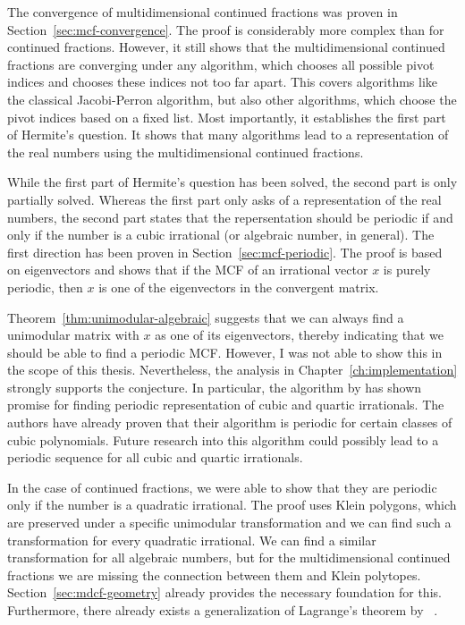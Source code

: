 The convergence of multidimensional continued fractions was proven in Section~\ref{sec:mcf-convergence}.
The proof is considerably more complex than for continued fractions.
However, it still shows that the multidimensional continued fractions are
converging under any algorithm, which chooses all possible pivot indices and
chooses these indices not too far apart.
This covers algorithms like the classical Jacobi-Perron algorithm,
but also other algorithms, which choose the pivot indices based on a fixed list.
Most importantly, it establishes the first part of Hermite's question.
It shows that many algorithms lead to a representation of the real numbers
using the multidimensional continued fractions.

While the first part of Hermite's question has been solved,
the second part is only partially solved.
Whereas the first part only asks of a representation of the real numbers,
the second part states that the repersentation should be periodic if and only
if the number is a cubic irrational (or algebraic number, in general).
The first direction has been proven in Section~\ref{sec:mcf-periodic}.
The proof is based on eigenvectors and shows that if the MCF of an irrational vector $x$ is
purely periodic, then $x$ is one of the eigenvectors in the convergent matrix.

Theorem~\ref{thm:unimodular-algebraic} suggests that we can always find a
unimodular matrix with $x$ as one of its eigenvectors,
thereby indicating that we should be able to find a periodic MCF.
However, I was not able to show this in the scope of this thesis.
Nevertheless, the analysis in Chapter~\ref{ch:implementation}
strongly supports the conjecture.
In particular, the algorithm by \citeauthor{Tamura09} has shown promise for
finding periodic representation of cubic and quartic irrationals.
The authors have already proven that their algorithm is periodic for certain
classes of cubic polynomials.
Future research into this algorithm could possibly lead to a periodic sequence
for all cubic and quartic irrationals.

In the case of continued fractions,
we were able to show that they are periodic only if the number is a quadratic irrational.
The proof uses Klein polygons, which are preserved under a specific unimodular transformation
and we can find such a transformation for every quadratic irrational.
We can find a similar transformation for all algebraic numbers, but for the
multidimensional continued fractions we are missing the connection between them
and Klein polytopes.
Section~\ref{sec:mdcf-geometry} already provides the necessary foundation for this.
Furthermore, there already exists a generalization of Lagrange's theorem by
\citeauthor{German08}~\cite{German08}.

